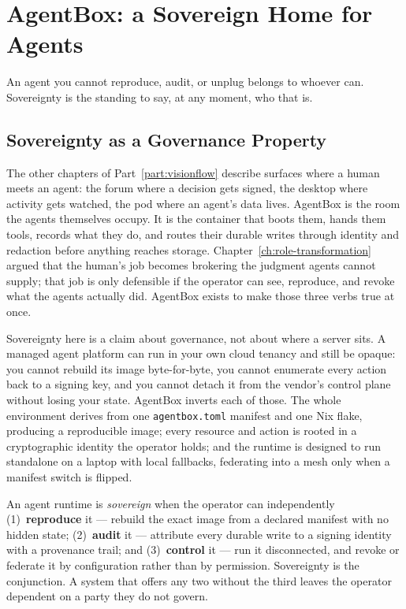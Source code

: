 \chapter{AgentBox: a Sovereign Home for Agents}
\label{ch:agentbox}

\epigraph{An agent you cannot reproduce, audit, or unplug belongs to whoever can. Sovereignty is the standing to say, at any moment, who that is.}{}

\section{Sovereignty as a Governance Property}

The other chapters of Part~\ref{part:visionflow} describe surfaces where a human meets an agent: the forum where a decision gets signed, the desktop where
activity gets watched, the pod where an agent's data lives. AgentBox is the room the agents themselves occupy. It is the container that boots them, hands them
tools, records what they do, and routes their durable writes through identity and redaction before anything reaches storage.
Chapter~\ref{ch:role-transformation} argued that the human's job becomes brokering the judgment agents cannot supply; that job is only defensible if the
operator can see, reproduce, and revoke what the agents actually did. AgentBox exists to make those three verbs true at once.

Sovereignty here is a claim about governance, not about where a server sits. A managed agent platform can run in your own cloud tenancy and still be opaque: you
cannot rebuild its image byte-for-byte, you cannot enumerate every action back to a signing key, and you cannot detach it from the vendor's control plane
without losing your state. AgentBox inverts each of those. The whole environment derives from one \texttt{agentbox.toml} manifest and one Nix flake, producing a
reproducible image; every resource and action is rooted in a cryptographic identity the operator holds; and the runtime is designed to run standalone on a
laptop with local fallbacks, federating into a mesh only when a manifest switch is flipped.

\begin{definitionbox}[title={Sovereignty, operationally}]
An agent runtime is \emph{sovereign} when the operator can independently (1)~\textbf{reproduce} it --- rebuild the exact image from a declared manifest with no
hidden state; (2)~\textbf{audit} it --- attribute every durable write to a signing identity with a provenance trail; and (3)~\textbf{control} it --- run it
disconnected, and revoke or federate it by configuration rather than by permission. Sovereignty is the conjunction. A system that offers any two without the
third leaves the operator dependent on a party they do not govern.
\end{definitionbox}

